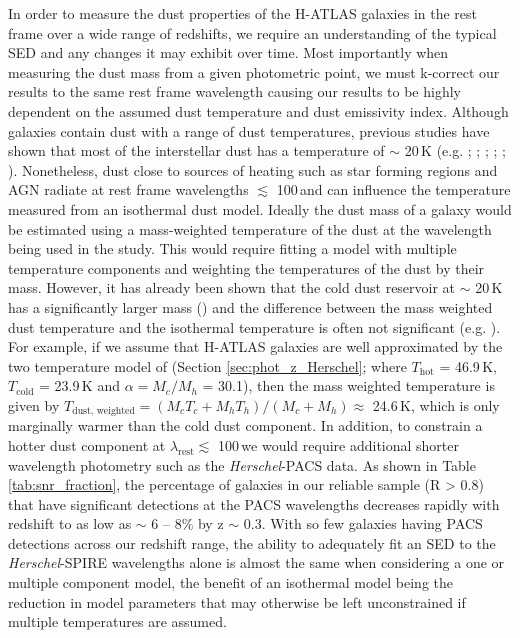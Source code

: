 In order to measure the dust properties of the H-ATLAS galaxies in the rest frame over a wide range of redshifts, we require an understanding of the typical SED and any changes it may exhibit over time. Most importantly when measuring the dust mass from a given photometric point, we must k-correct our results to the same rest frame wavelength causing our results to be highly dependent on the assumed dust temperature and dust emissivity index. Although galaxies contain dust with a range of dust temperatures, previous studies have shown that most of the interstellar dust has a temperature of $\sim$ 20\,K (e.g. \citealt{Dunne_2001}; \citealt{Vlahakis_2005}; \citealt{Draine_2007}; \citealt{Boselli_2010}; \citealt{Smith_2012b}; \citealt{Smith_2013}). Nonetheless, dust close to sources of heating such as star forming regions and AGN radiate at rest frame wavelengths $\lesssim$ 100\,\micron and can influence the temperature measured from an isothermal dust model. Ideally the dust mass of a galaxy would be estimated using a mass-weighted temperature of the dust at the wavelength being used in the study. This would require fitting a model with multiple temperature components and weighting the temperatures of the dust by their mass. However, it has already been shown that the cold dust reservoir at $\sim$ 20\,K has a significantly larger mass (\citealt{Pearson_2013}) and the difference between the mass weighted dust temperature and the isothermal temperature is often not significant (e.g. \citealt{Clark_2015}). For example, if we assume that H-ATLAS galaxies are well approximated by the two temperature model of \citealt{Pearson_2013} (Section \ref{sec:phot_z_Herschel}; where $T_{\textrm{hot}}$ = 46.9\,K, $T_{\textrm{cold}}$ = 23.9\,K and $\alpha = M_c/M_h$ = 30.1), then the mass weighted temperature is given by $T_{\textrm{dust, weighted}} = (M_cT_c + M_hT_h)/(M_c + M_h) \approx$ 24.6\,K, which is only marginally warmer than the cold dust component. In addition, to constrain a hotter dust component at $\lambda_{\textrm{rest}} \lesssim$ 100\,\micron we would require additional shorter wavelength photometry such as the \textit{Herschel}-PACS data. As shown in Table \ref{tab:snr_fraction}, the percentage of galaxies in our reliable sample (R > 0.8) that have significant detections at the PACS wavelengths decreases rapidly with redshift to as low as $\sim$ 6 -- 8\% by z $\sim$ 0.3. With so few galaxies having PACS detections across our redshift range, the ability to adequately fit an SED to the \textit{Herschel}-SPIRE wavelengths alone is almost the same when considering a one or multiple component model, the benefit of an isothermal model being the reduction in model parameters that may otherwise be left unconstrained if multiple temperatures are assumed.

